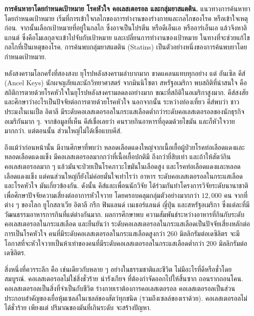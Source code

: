 {\begin{shaded}
\textbf{การค้นหายาโดยกำหนดเป้าหมาย โรคหัวใจ คอเลสเตอรอล และกลุ่มยาสแตติน.}
แนวทางการค้นหายาโดยกำหนดเป้าหมาย เริ่มที่การเข้าใจกลไกของการทำงานของร่างกายและกลไกของโรค หรือเข้าใจเหตุก่อน.
จากนั้นเลือกเป้าหมายที่อยู่ในกลไก ซึ่งอาจเป็นโปรตีน หรือดีเอ็นเอ หรืออาร์เอ็นเอ 
แล้วจึงหาลิแกนต์ ซึ่งคือโมเลกุลจะเข้าไปจับกับเป้าหมาย และเปลี่ยนการทำงานของเป้าหมาย ในทางที่จะช่วยแก้ไขกลไกที่เป็นเหตุของโรค.
การค้นพบกลุ่มยาสแตติน (Statins) เป็นตัวอย่างหนึ่งของการค้นพบยาโดยกำหนดเป้าหมาย.

หลังสงครามโลกครั้งที่สองสงบ
ยุโรปหลังสงครามลำบากมาก ขาดแคลนแทบทุกอย่าง
แต่ อันเซิล คีส์ (Ancel Keys) นักผจญภัยและนักวิทยาศาสตร์ จากมินนิโซตา สหรัฐอเมริกา
พบสถิติที่น่าสนใจ คือ สถิติการตายด้วยโรคหัวใจในยุโรปหลังสงครามลดลงอย่างมาก 
ขณะที่สถิติในอเมริกาสูงมาก.
คีส์สงสัย และศึกษาว่าอะไรเป็นปัจจัยต่อการตายด้วยโรคหัวใจ 
นอกจากนั้น ระหว่างท่องเที่ยว คีส์พบว่า ชาวประมงในเนเปิ้ล อิตาลี มีระดับคอเลสเตอรอลในกระแสเลือดต่ำกว่าระดับคอเลสเตอรอลของนักธุรกิจอเมริกันมาก ๆ.
จากข้อมูลที่เห็น คีส์เชื่อเลยว่า คนรวยกินอาหารที่อุดมด้วยไขมัน และก็หัวใจวายมากกว่า.
แต่ตอนนั้น ส่วนใหญ่ไม่ได้เชื่อแบบคีส์.

ถึงแม้ว่าก่อนหน้านั้น
มีงานศึกษาที่พบว่า หลอดเลือดแดงใหญ่จากเนื้อเยื้อผู้ป่วยโรคท่อเลือดแดงและหลอดเลือดแดงแข็ง
มีคอเลสเตอรอลมากกว่าที่เนื้อเยื้อปกติมี ถึงกว่ายี่สิบเท่า
และถ้าให้สัตว์กินคอเลสเตอรอลมาก ๆ แล้วมันจะป่วยเป็นโรคภาวะไขมันในเลือดสูง และโรคท่อเลือดแดงและหลอดเลือดแดงแข็ง
แต่คนส่วนใหญ่ก็ยังไม่ค่อยมั่นใจเท่าไรว่า อาหาร ระดับคอเลสเตอรอลในกระแสเลือด และโรคหัวใจ มันเกี่ยวข้องกัน.
ดังนั้น คีส์และเพื่อนนักวิจัย ได้ร่วมกันทำโครงการวิจัยระดับนานาชาติ เพื่อศึกษาปัจจัยความเสี่ยงต่ออาการหัวใจวาย 
โดยครอบคลุมกลุ่มตัวอย่างมากกว่า $12,000$ คน จากที่ต่าง ๆ  ของโลก ยูโกสลาเวีย อิตาลี กรีก ฟินแลนด์ เนเธอร์แลนด์ ญี่ปุ่น และสหรัฐอเมริกา ซึ่งแต่ละที่มีวัฒนธรรมอาหารการกินที่แต่ต่างกันมาก.
ผลการศึกษาพบ ความสัมพันธ์ระหว่างอาหารที่กินกับระดับคอเลสเตอรอลในกระแสเลือด
และยืนยันว่า ระดับคอเลสเตอรอลในกระแสเลือดเป็นปัจจัยเสี่ยงหลักต่อการเป็นโรคหัวใจ
คนที่มีระดับคอเลสเตอรอลในกระแสเลือดสูงกว่า $260$ มิลลิกรัมต่อเดซิลิตร
จะมีโอกาสที่จะหัวใจวายเป็นห้าเท่าของคนที่มีระดับคอเลสเตอรอลในกระแสเลือดต่ำกว่า $200$ มิลลิกรัมต่อเดซิลิตร.

สิ่งหนึ่งที่ควรระลึก คือ
เช่นเดียวกับหลาย ๆ อย่างในธรรมชาติและชีวิต
ไม่มีอะไรที่ดีหรือชั่วโดยสมบูรณ์.
คอเลสเตอรอลไม่ใช่สิ่งชั่วร้าย น่ารังเกียจ ที่ต้องกำจัดออกไปให้สิ้นซาก ถอนรากถอนโคน.
คอเลสเตอรอลเป็นสิ่งที่จำเป็นกับชีวิต ร่างกายเราต้องการคอเลสเตอรอล
คอเลสเตอรอลเป็นส่วนประกอบสำคัญของเยื่อหุ้มเซลล์ในเซลล์ของสัตว์ทุกชนิด (รวมถึงเซลล์ของเราด้วย).
คอเลสเตอรอลไม่ได้ชั่วร้าย 
เพียงแต่
ปริมาณของมันที่เกินระดับ จะสร้างปัญหา.


\end{shaded}}

